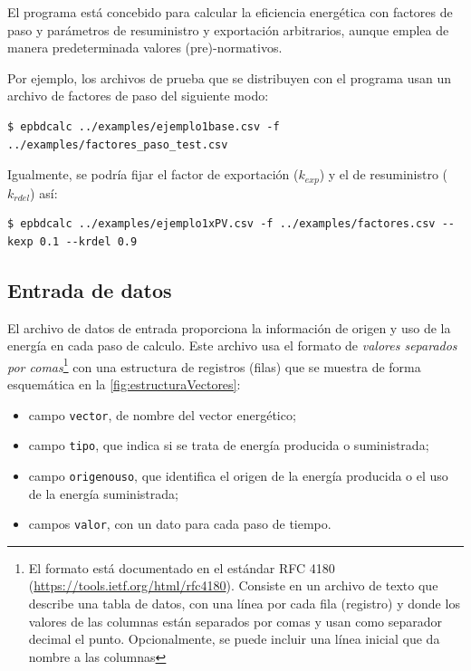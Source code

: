 \documentclass[10pt,notitlepage,oneside,a4paper]{article}
\begin{document}
El programa está concebido para calcular la eficiencia energética con factores de paso y parámetros de resuministro y exportación arbitrarios, aunque emplea de manera predeterminada valores (pre)-normativos.

Por ejemplo, los archivos de prueba que se distribuyen con el programa usan un archivo de factores de paso del siguiente modo:

\begin{Verbatim}[fontsize=\small]
	$ epbdcalc ../examples/ejemplo1base.csv -f ../examples/factores_paso_test.csv 
\end{Verbatim}

Igualmente, se podría fijar el factor de exportación ($k_{exp}$) y el de resuministro ($k_{rdel}$) así:

\begin{Verbatim}[fontsize=\small]
	$ epbdcalc ../examples/ejemplo1xPV.csv -f ../examples/factores.csv --kexp 0.1 --krdel 0.9
\end{Verbatim}

\subsection{Entrada de datos}

El archivo de datos de entrada proporciona la información de origen y uso de la energía en cada paso de calculo. Este archivo usa el formato de \textit{valores separados por comas}\footnote{El formato está documentado en el estándar RFC 4180 (\url{https://tools.ietf.org/html/rfc4180}). Consiste en un archivo de texto que describe una tabla de datos, con una línea por cada fila (registro) y donde los valores de las columnas están separados por comas y usan como separador decimal el punto. Opcionalmente, se puede incluir una línea inicial que da nombre a las columnas} con una estructura de registros (filas) que se muestra de forma esquemática en la \autoref{fig:estructuraVectores}:

\begin{itemize}
\item campo \texttt{vector}, de nombre del vector energético;
\item campo \texttt{tipo}, que indica si se trata de energía producida o suministrada;
\item campo \texttt{origenouso}, que identifica el origen de la energía producida o el uso de la energía suministrada;
\item campos \texttt{valor}, con un dato para cada paso de tiempo.
\end{itemize}
\end{document}
